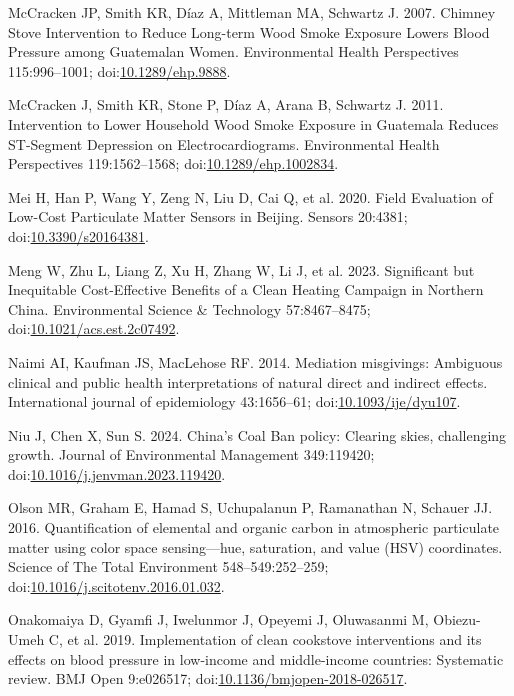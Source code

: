 \documentclass[
  letterpaper,
  DIV=11,
  numbers=noendperiod]{scrartcl}
\newlength{\cslhangindent}
\newenvironment{CSLReferences}[2] %
 {\begin{list}{}{%
  \setlength{\itemindent}{0pt}
  \setlength{\leftmargin}{0pt}
  \setlength{\parsep}{0pt}
  \ifodd #1
   \setlength{\leftmargin}{\cslhangindent}
   \setlength{\itemindent}{-1\cslhangindent}
  \fi
  \setlength{\itemsep}{#2\baselineskip}}}
 {\end{list}}
\begin{document}
\begin{CSLReferences}{1}{1}
McCracken JP, Smith KR, Díaz A, Mittleman MA, Schwartz J. 2007. Chimney
{Stove Intervention} to {Reduce Long-term Wood Smoke Exposure Lowers
Blood Pressure} among {Guatemalan Women}. Environmental Health
Perspectives 115:996--1001;
doi:\href{https://doi.org/10.1289/ehp.9888}{10.1289/ehp.9888}.

McCracken J, Smith KR, Stone P, Díaz A, Arana B, Schwartz J. 2011.
Intervention to {Lower Household Wood Smoke Exposure} in {Guatemala
Reduces ST-Segment Depression} on {Electrocardiograms}. Environmental
Health Perspectives 119:1562--1568;
doi:\href{https://doi.org/10.1289/ehp.1002834}{10.1289/ehp.1002834}.

Mei H, Han P, Wang Y, Zeng N, Liu D, Cai Q, et al. 2020. Field
{Evaluation} of {Low-Cost Particulate Matter Sensors} in {Beijing}.
Sensors 20:4381;
doi:\href{https://doi.org/10.3390/s20164381}{10.3390/s20164381}.

Meng W, Zhu L, Liang Z, Xu H, Zhang W, Li J, et al. 2023. Significant
but {Inequitable Cost-Effective Benefits} of a {Clean Heating Campaign}
in {Northern China}. Environmental Science \& Technology 57:8467--8475;
doi:\href{https://doi.org/10.1021/acs.est.2c07492}{10.1021/acs.est.2c07492}.

Naimi AI, Kaufman JS, MacLehose RF. 2014. Mediation misgivings:
Ambiguous clinical and public health interpretations of natural direct
and indirect effects. International journal of epidemiology 43:1656--61;
doi:\href{https://doi.org/10.1093/ije/dyu107}{10.1093/ije/dyu107}.

Niu J, Chen X, Sun S. 2024. China's {Coal Ban} policy: {Clearing} skies,
challenging growth. Journal of Environmental Management 349:119420;
doi:\href{https://doi.org/10.1016/j.jenvman.2023.119420}{10.1016/j.jenvman.2023.119420}.

Olson MR, Graham E, Hamad S, Uchupalanun P, Ramanathan N, Schauer JJ.
2016. Quantification of elemental and organic carbon in atmospheric
particulate matter using color space sensing---hue, saturation, and
value ({HSV}) coordinates. Science of The Total Environment
548--549:252--259;
doi:\href{https://doi.org/10.1016/j.scitotenv.2016.01.032}{10.1016/j.scitotenv.2016.01.032}.

Onakomaiya D, Gyamfi J, Iwelunmor J, Opeyemi J, Oluwasanmi M,
Obiezu-Umeh C, et al. 2019. Implementation of clean cookstove
interventions and its effects on blood pressure in low-income and
middle-income countries: Systematic review. BMJ Open 9:e026517;
doi:\href{https://doi.org/10.1136/bmjopen-2018-026517}{10.1136/bmjopen-2018-026517}.


\end{CSLReferences}
\end{document}
